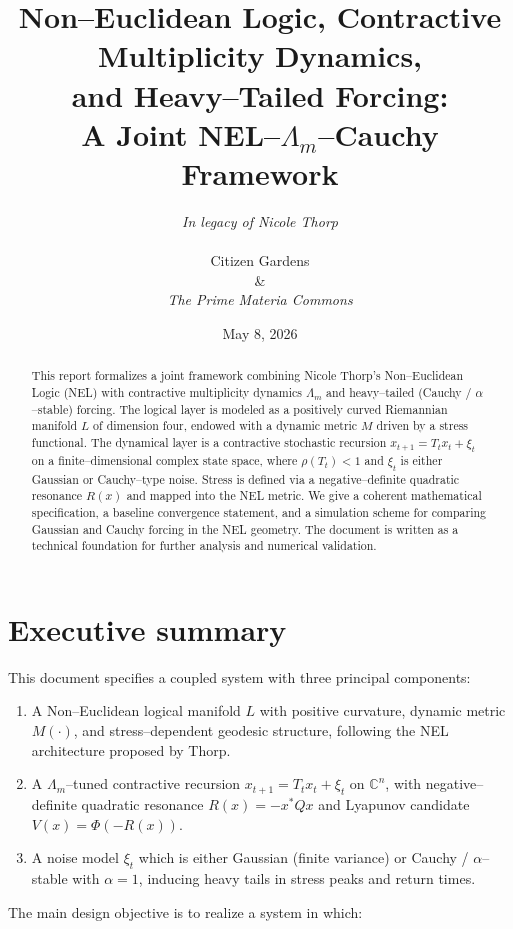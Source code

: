\documentclass[11pt]{article}
\title{%
Non--Euclidean Logic, Contractive Multiplicity Dynamics,\\
and Heavy--Tailed Forcing:\\
A Joint NEL--$\Lambda_m$--Cauchy Framework}
\author{%
\Large \textit{In legacy of Nicole Thorp} \\ \\ \Large Citizen Gardens \\ \& \\ \textit{The Prime Materia Commons}
}
\date{May 8, 2026}
\theoremstyle{plain}
\theoremstyle{definition}
\numberwithin{equation}{section}
\begin{document}
\maketitle

\begin{abstract}
This report formalizes a joint framework combining Nicole Thorp's
Non--Euclidean Logic (NEL) with contractive multiplicity dynamics
$\Lambda_m$ and heavy--tailed (Cauchy / $\alpha$--stable) forcing.
The logical layer is modeled as a positively curved Riemannian manifold
$L$ of dimension four, endowed with a dynamic metric $M$ driven by a
stress functional. The dynamical layer is a contractive stochastic
recursion $x_{t+1} = T_t x_t + \xi_t$ on a finite--dimensional complex
state space, where $\rho(T_t) < 1$ and $\xi_t$ is either Gaussian or
Cauchy--type noise. Stress is defined via a negative--definite quadratic
resonance $R(x)$ and mapped into the NEL metric. We give a coherent
mathematical specification, a baseline convergence statement, and a
simulation scheme for comparing Gaussian and Cauchy forcing in the NEL
geometry. The document is written as a technical foundation for further
analysis and numerical validation.
\end{abstract}
\newpage
\tableofcontents
\newpage
\section{Executive summary}

This document specifies a coupled system with three principal
components:

\begin{enumerate}[label=(\roman*)]
  \item A Non--Euclidean logical manifold $L$ with positive curvature,
  dynamic metric $M(\cdot)$, and stress--dependent geodesic structure,
  following the NEL architecture proposed by Thorp.

  \item A $\Lambda_m$--tuned contractive recursion $x_{t+1} = T_t x_t + \xi_t$
  on $\mathbb{C}^n$, with negative--definite quadratic resonance
  $R(x) = - x^\ast Q x$ and Lyapunov candidate $V(x) = \Phi(-R(x))$.

  \item A noise model $\xi_t$ which is either Gaussian (finite variance)
  or Cauchy / $\alpha$--stable with $\alpha = 1$, inducing heavy tails
  in stress peaks and return times.
\end{enumerate}

The main design objective is to realize a system in which:
\end{document}
